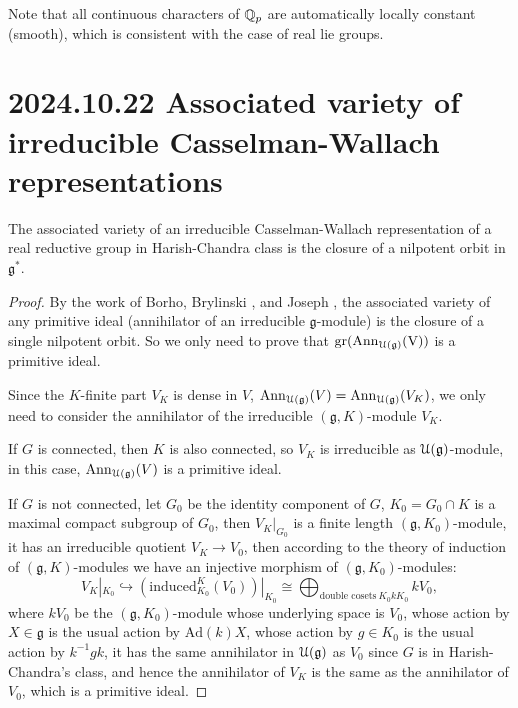 \documentclass[12pt]{amsart}
\numberwithin{equation}{section}
\newcommand{\fg}{\mathfrak{g}} \newcommand{\fh}{\mathfrak{h}} \newcommand{\fk}{\mathfrak{k}}
\newcommand{\Ad}{{\mathrm{Ad}}}   \newcommand{\ad}{{\mathrm{ad}}}
\begin{document}
\begin{rk}
  Note that all continuous characters of ${\mathbb {Q}}_p$ are automatically locally constant (smooth), which is consistent with the case of real lie groups. 
\end{rk}



\section{2024.10.22 Associated variety of irreducible Casselman-Wallach representations}

\begin{lem}
  The associated variety of an irreducible Casselman-Wallach representation of a real reductive group in Harish-Chandra class is the closure of a nilpotent orbit in $\fg^*$.
\end{lem}

\begin{proof}
  By the work of Borho, Brylinski \cite{BB82}, and Joseph \cite{Jos85}, the associated variety of any primitive ideal (annihilator of an irreducible $\fg$-module) is the closure of a single nilpotent orbit. So we only need to prove that $\mathrm{gr}(\mathrm{Ann_{\CU(\fg)}(V)})$ is a primitive ideal.

  Since the $K$-finite part $V_K$ is dense in $V$, $\Ann_{\CU(\fg)}(V) = \Ann_{\CU(\fg)}(V_K)$, we only need to consider the annihilator of the irreducible $(\fg,K)$-module $V_K$.

  If $G$ is connected, then $K$ is also connected, so $V_K$ is irreducible as $\CU(\fg)$-module, in this case, $\Ann_{\CU(\fg)}(V)$ is a primitive ideal.

  If $G$ is not connected, let $G_0$ be the identity component of $G$, $K_0 = G_0 \cap K$ is a maximal compact subgroup of $G_0$, then $V_K|_{G_0}$ is a finite length $(\fg,K_0)$-module, it has an irreducible quotient $V_K \to V_0$, then according to the theory of induction of $(\fg,K)$-modules \cite[Chapter 2]{KV95} we have an injective morphism of $(\fg,K_0)$-modules:
  \begin{equation}
     V_K|_{K_0} \hookrightarrow  (\mathrm{induced}_{K_0}^{K}(V_0))|_{K_0} \cong \bigoplus_{\textrm{double cosets} \ K_0 k K_0} kV_0,
  \end{equation}
  where $kV_0$ be the $(\fg,K_0)$-module whose underlying space is $V_0$, whose action by $X \in \fg$ is the usual action by $\Ad(k)X$, whose action by $g \in K_0$ is the usual action by $k^{-1}gk$, it has the same annihilator in $\CU(\fg)$ as $V_0$ since $G$ is in Harish-Chandra's class, and hence the annihilator of $V_K$ is the same as the annihilator of $V_0$, which is a primitive ideal.

\end{proof}
\end{document}
